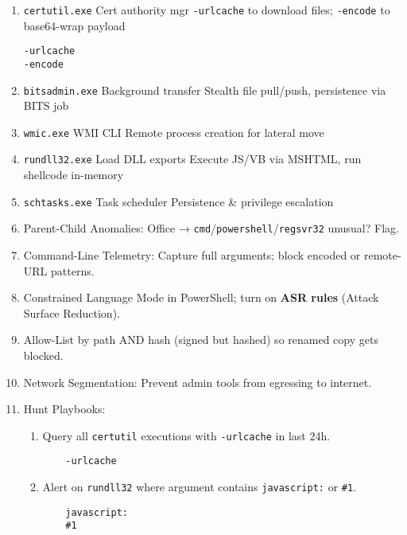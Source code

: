 \documentclass[a4paper,12pt]{article}
\begin{document}
\begin{enumerate}[leftmargin=*,itemsep=0.5em]
  \item \texttt{certutil.exe} Cert authority mgr \texttt{-urlcache} to download files; \texttt{-encode} to base64-wrap payload
    \begin{tcolorbox}[colback=codebg, boxrule=0.5pt, arc=4pt, boxsep=5pt]
\begin{verbatim}
-urlcache
-encode
\end{verbatim}
    \end{tcolorbox}
  \item \texttt{bitsadmin.exe} Background transfer Stealth file pull/push, persistence via BITS job
  \item \texttt{wmic.exe} WMI CLI Remote process creation for lateral move
  \item \texttt{rundll32.exe} Load DLL exports Execute JS/VB via MSHTML, run shellcode in-memory
  \item \texttt{schtasks.exe} Task scheduler Persistence \& privilege escalation
  \item Parent-Child Anomalies: Office → \texttt{cmd}/\texttt{powershell}/\texttt{regsvr32} unusual? Flag.
  \item Command-Line Telemetry: Capture full arguments; block encoded or remote-URL patterns.
  \item Constrained Language Mode in PowerShell; turn on \textbf{ASR rules} (Attack Surface Reduction).
  \item Allow-List by path AND hash (signed but hashed) so renamed copy gets blocked.
  \item Network Segmentation: Prevent admin tools from egressing to internet.
  \item Hunt Playbooks:
    \begin{enumerate}
      \item Query all \texttt{certutil} executions with \texttt{-urlcache} in last 24h.
        \begin{tcolorbox}[colback=codebg, boxrule=0.5pt, arc=4pt, boxsep=5pt]
    \begin{verbatim}
    -urlcache
    \end{verbatim}
        \end{tcolorbox}
      \item Alert on \texttt{rundll32} where argument contains \texttt{javascript:} or \texttt{\#1}.
        \begin{tcolorbox}[colback=codebg, boxrule=0.5pt, arc=4pt, boxsep=5pt]
    \begin{verbatim}
    javascript:
    #1
    \end{verbatim}

\end{tcolorbox}
\end{enumerate}
\end{enumerate}
\end{document}
